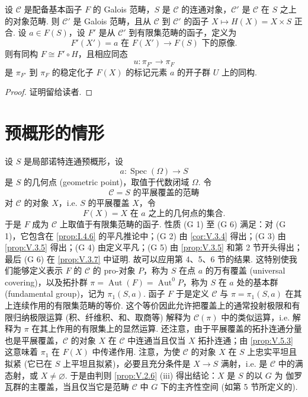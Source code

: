 \begin{proposition}\label{prop:V.6.13}
设 $\mathcal{C}$ 是配备基本函子 $F$ 的 Galois 范畴，$S$ 是 $\mathcal{C}$ 的连通对象，$\mathcal{C}'$ 是 $\mathcal{C}$ 在 $S$ 之上的对象范畴. 则 $\mathcal{C}'$ 是 Galois 范畴，且从 $\mathcal{C}$ 到 $\mathcal{C}'$ 的函子 $X \mapsto H(X) = X \times S$ 正合. 设 $a \in F(S)$，设 $F'$ 是从 $\mathcal{C}'$ 到有限集范畴的函子，定义为
\[
F'(X') = a \text{ 在 } F(X') \longrightarrow F(S) \text{ 下的原像}.
\]
则有同构 $F \cong F' \circ H$，且相应同态
\[
u \colon \pi_{F'} \longrightarrow \pi_F
\]
是 $\pi_{F'}$ 到 $\pi_F$ 的稳定化子 $F(X)$ 的标记元素 $a$ 的开子群 $U$ 上的同构.
\end{proposition}

\begin{proof}
证明留给读者.
\end{proof}

\section{预概形的情形}

设 $S$ 是局部诺特连通预概形，设
\[
a \colon \operatorname{Spec}(\Omega) \longrightarrow S
\]
是 $S$ 的几何点 (geometric point)，取值于代数闭域 $\Omega$. 令
\[
\mathcal{C} = S \text{ 的平展覆盖的范畴}
\]
对 $\mathcal{C}$ 的对象 $X$，i.e. $S$ 的平展覆盖 $X$，令
\[
F(X) = X \text{ 在 } a \text{ 之上的几何点的集合}.
\]
于是 $F$ 成为 $\mathcal{C}$ 上取值于有限集范畴的函子. 性质 (G 1) 至 (G 6) 满足：对 (G 1)，它包含在 \ref{prop:I.4.6} 的平凡推论中；(G 2) 由 \ref{cor:V.3.4} 得出；(G 3) 由 \ref{prop:V.3.5} 得出；(G 4) 由定义平凡；(G 5) 由 \ref{prop:V.3.5} 和第 2 节开头得出；最后 (G 6) 在 \ref{prop:V.3.7} 中证明. 故可以应用第 4、5、6 节的结果. 这特别使我们能够定义表示 $F$ 的 $\mathcal{C}$ 的 pro-对象 $P$，称为 $S$ 在点 $a$ 的万有覆盖 (universal covering)，以及拓扑群 $\pi = \operatorname{Aut}(F) = \operatorname{Aut}^{0}P$，称为 $S$ 在 $a$ 处的基本群 (fundamental group)，记为 $\pi_1(S, a)$. 函子 $F$ 于是定义 $\mathcal{C}$ 与 $\pi = \pi_1(S, a)$ 在其上连续作用的有限集范畴的等价. 这个等价因此允许把覆盖上的通常投射极限和有限归纳极限运算 (积、纤维积、和、取商等) 解释为 $\mathcal{C}(\pi)$ 中的类似运算，i.e. 解释为 $\pi$ 在其上作用的有限集上的显然运算. 还注意，由于平展覆盖的拓扑连通分量也是平展覆盖，$\mathcal{C}$ 的对象 $X$ 在 $\mathcal{C}$ 中连通当且仅当 $X$ 拓扑连通；由 \ref{prop:V.5.3} 这意味着 $\pi_1$ 在 $F(X)$ 中传递作用. 注意，为使 $\mathcal{C}$ 的对象 $X$ 在 $S$ 上忠实平坦且拟紧 (它已在 $S$ 上平坦且拟紧)，必要且充分条件是 $X \to S$ 满射，i.e. 是 $\mathcal{C}$ 中的满态射，或 $X \neq \varnothing$. 于是由判则 \ref{prop:V.2.6} (iii) 得出结论：$X$ 是 $S$ 的以 $G$ 为 伽罗瓦群的主覆盖，当且仅当它是范畴 $\mathcal{C}$ 中 $G$ 下的主齐性空间 (如第 5 节所定义的).

